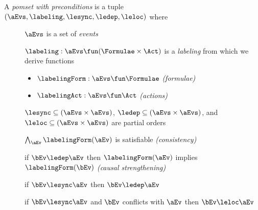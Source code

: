 \begin{definition}
  A \emph{pomset with preconditions} is a tuple
  $(\aEvs, \labeling, {\lesync}, {\ledep}, {\leloc})$ where
  \begin{description}
  \item[{}] $\aEvs$ is a set of \emph{events}
  \item[{}]
    $\labeling: \aEvs \fun (\Formulae\times\Act)$ is a \emph{labeling} from
    which we derive functions
    \begin{itemize}
    \item $\labelingForm:\aEvs\fun\Formulae$
      \emph{(formulae)} %
    \item $\labelingAct:\aEvs\fun\Act$
      \emph{(actions)} %
    \end{itemize}
  \item[{}]
    ${\lesync} \subseteq (\aEvs\times\aEvs)$,
    ${\ledep} \subseteq (\aEvs\times\aEvs)$, and
    ${\leloc} \subseteq (\aEvs\times\aEvs)$ are partial orders
  \item[{}] $\bigwedge_{\aEv}\labelingForm(\aEv)$ is satisfiable \emph{(consistency)}
  \item[{}] if $\bEv\ledep\aEv$ then $\labelingForm(\aEv)$ implies $\labelingForm(\bEv)$ \emph{(causal strengthening)} 
  \item[{}] if $\bEv\lesync\aEv$ then $\bEv\ledep\aEv$
  \item[{}] if $\bEv\lesync\aEv$ and $\bEv$ conflicts with $\aEv$ then $\bEv\leloc\aEv$
  \end{description}
\end{definition}





